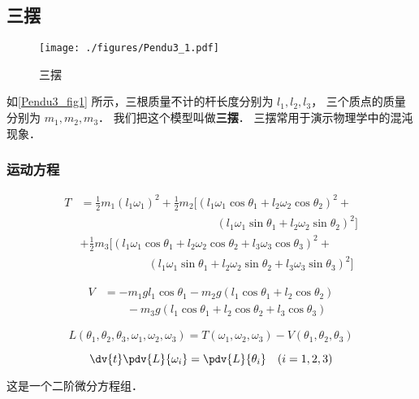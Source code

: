 \subsection{三摆}
\begin{figure}[ht]
\centering
\texttt{[image: ./figures/Pendu3\_1.pdf]}
\caption{三摆} \label{Pendu3_fig1}
\end{figure}
如\autoref{Pendu3_fig1} 所示，三根质量不计的杆长度分别为 $l_1, l_2, l_3$， 三个质点的质量分别为 $m_1, m_2, m_3$． 我们把这个模型叫做\textbf{三摆}． 三摆常用于演示物理学中的混沌现象．

\subsubsection{运动方程}
\begin{equation}
\begin{aligned}
T &= \frac{1}{2} m_1 (l_1 \omega_1)^2 + \frac{1}{2} m_2 [(l_1 \omega_1 \cos\theta_1 + l_2 \omega_2 \cos\theta_2)^2 +\\
&\qquad \qquad\qquad\qquad\qquad\qquad (l_1 \omega_1 \sin\theta_1 + l_2 \omega_2 \sin\theta_2)^2]\\
& + \frac{1}{2} m_3 [(l_1 \omega_1 \cos\theta_1 + l_2 \omega_2 \cos\theta_2 + l_3 \omega_3 \cos \theta_3)^2 +\\
&\qquad\qquad\qquad (l_1 \omega_1 \sin\theta_1 + l_2 \omega_2 \sin\theta_2 + l_3 \omega_3 \sin\theta_3)^2]
\end{aligned}
\end{equation}

\begin{equation} 
\begin{aligned} 
V &= -m_1 g l_1 \cos \theta_1 - m_2 g (l_1\cos \theta_1 + l_2 \cos \theta_2)\\
&\qquad - m_3 g (l_1 \cos\theta_1 + l_2 \cos \theta_2 + l_3 \cos \theta_3)
\end{aligned}
\end{equation}

\begin{equation}
L(\theta_1, \theta_2, \theta_3, \omega_1, \omega_2, \omega_3) = T(\omega_1, \omega_2, \omega_3) - V(\theta_1, \theta_2, \theta_3)
\end{equation}

\begin{equation}
\dv{t} \pdv{L}{\omega_i} = \pdv{L}{\theta_i} \quad (i=1,2,3)
\end{equation}

这是一个二阶微分方程组．


